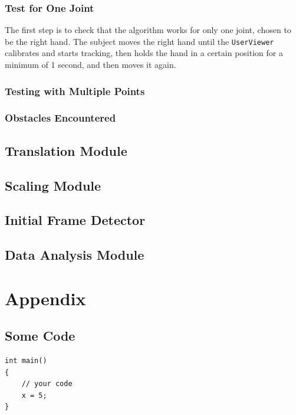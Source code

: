 \documentclass[10pt]{article}
\begin{document}
\subsubsection{Test for One Joint}
The first step is to check that the algorithm works for only one joint, chosen to be the right hand. The subject moves the right hand until the \texttt{UserViewer} calibrates and starts tracking, then holds the hand in a certain position for a minimum of 1 second, and then moves it again. 
\subsubsection{Testing with Multiple Points}
\subsubsection{Obstacles Encountered}


\subsection{Translation Module}
\subsection{Scaling Module}
\subsection{Initial Frame Detector}
\subsection{Data Analysis Module}

\section*{Appendix}
\subsection*{Some Code}
\begin{lstlisting}
int main()
{
	// your code
	x = 5;
}

\end{lstlisting}
\end{document}
